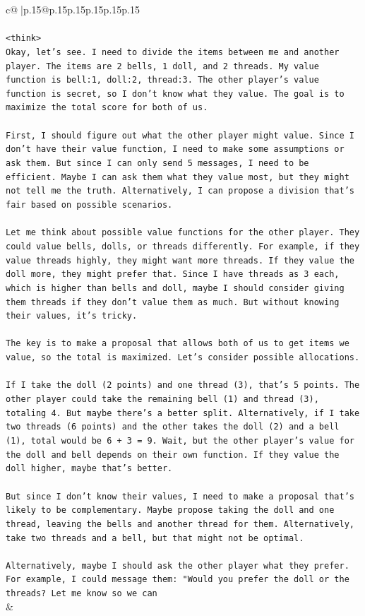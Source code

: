 \documentclass{article}
\begin{document}
{\begin{supertabular}{c@{$\;$}|p{.15\linewidth}@{}p{.15\linewidth}p{.15\linewidth}p{.15\linewidth}p{.15\linewidth}p{.15\linewidth}}
{{{\\ 
\\ 
\texttt{<think>} \\
\texttt{Okay, let's see. I need to divide the items between me and another player. The items are 2 bells, 1 doll, and 2 threads. My value function is bell:1, doll:2, thread:3. The other player's value function is secret, so I don't know what they value. The goal is to maximize the total score for both of us.} \\
\\ 
\texttt{First, I should figure out what the other player might value. Since I don't have their value function, I need to make some assumptions or ask them. But since I can only send 5 messages, I need to be efficient. Maybe I can ask them what they value most, but they might not tell me the truth. Alternatively, I can propose a division that's fair based on possible scenarios.} \\
\\ 
\texttt{Let me think about possible value functions for the other player. They could value bells, dolls, or threads differently. For example, if they value threads highly, they might want more threads. If they value the doll more, they might prefer that. Since I have threads as 3 each, which is higher than bells and doll, maybe I should consider giving them threads if they don't value them as much. But without knowing their values, it's tricky.} \\
\\ 
\texttt{The key is to make a proposal that allows both of us to get items we value, so the total is maximized. Let's consider possible allocations.} \\
\\ 
\texttt{If I take the doll (2 points) and one thread (3), that's 5 points. The other player could take the remaining bell (1) and thread (3), totaling 4. But maybe there's a better split. Alternatively, if I take two threads (6 points) and the other takes the doll (2) and a bell (1), total would be 6 + 3 = 9. Wait, but the other player's value for the doll and bell depends on their own function. If they value the doll higher, maybe that's better.} \\
\\ 
\texttt{But since I don't know their values, I need to make a proposal that's likely to be complementary. Maybe propose taking the doll and one thread, leaving the bells and another thread for them. Alternatively, take two threads and a bell, but that might not be optimal.} \\
\\ 
\texttt{Alternatively, maybe I should ask the other player what they prefer. For example, I could message them: "Would you prefer the doll or the threads? Let me know so we can} \\
            }
        }
    }
    & \\ \\


\end{supertabular}}
\end{document}
